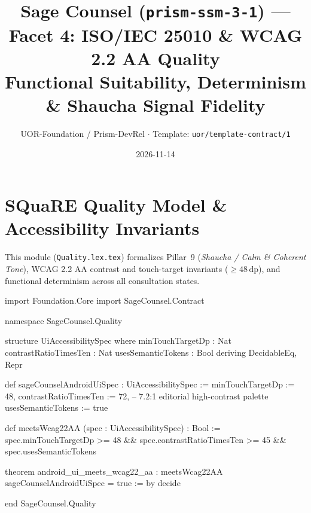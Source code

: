 \documentclass[11pt,a4paper]{article}
\title{Sage Counsel (\texttt{prism-ssm-3-1}) --- Facet 4: ISO/IEC 25010 \& WCAG 2.2 AA Quality\\
\small Functional Suitability, Determinism \& Shaucha Signal Fidelity}
\author{UOR-Foundation / Prism-DevRel $\cdot$ Template: \texttt{uor/template-contract/1}}
\date{2026-11-14}
\begin{document}
\maketitle

\section{SQuaRE Quality Model \& Accessibility Invariants}
This module (\texttt{Quality.lex.tex}) formalizes Pillar~9 (\emph{Shaucha / Calm \& Coherent Tone}), WCAG 2.2 AA contrast and touch-target invariants ($\ge 48\,\mathrm{dp}$), and functional determinism across all consultation states.

\begin{code}
import Foundation.Core
import SageCounsel.Contract

namespace SageCounsel.Quality

structure UiAccessibilitySpec where
  minTouchTargetDp      : Nat
  contrastRatioTimesTen : Nat
  usesSemanticTokens    : Bool
  deriving DecidableEq, Repr

def sageCounselAndroidUiSpec : UiAccessibilitySpec :=
  { minTouchTargetDp := 48,
    contrastRatioTimesTen := 72, -- 7.2:1 editorial high-contrast palette
    usesSemanticTokens := true }

def meetsWcag22AA (spec : UiAccessibilitySpec) : Bool :=
  spec.minTouchTargetDp >= 48 &&
  spec.contrastRatioTimesTen >= 45 &&
  spec.usesSemanticTokens

theorem android_ui_meets_wcag22_aa :
    meetsWcag22AA sageCounselAndroidUiSpec = true := by
  decide

end SageCounsel.Quality
\end{code}
\end{document}

